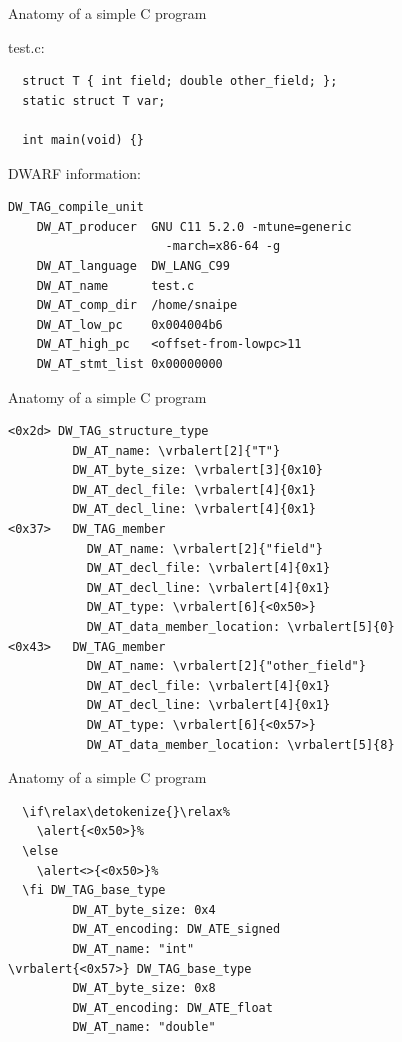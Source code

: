 \documentclass[10pt]{beamer}
\newcommand{\vrbalert}[2][]{%
  \if\relax\detokenize{#1}\relax%
    \alert{#2}%
  \else
    \alert<#1>{#2}%
  \fi}
\begin{document}
\begin{frame}[fragile]{Anatomy of a simple C program}

  test.c:
  \begin{lstlisting}
  struct T { int field; double other_field; };
  static struct T var;

  int main(void) {}
  \end{lstlisting}

  \pause{}

  DWARF information:
  \begin{Verbatim}[commandchars=\\\{\},fontsize=\small,frame=single]
  DW_TAG_compile_unit
    DW_AT_producer  GNU C11 5.2.0 -mtune=generic 
                      -march=x86-64 -g
    DW_AT_language  DW_LANG_C99
    DW_AT_name      test.c
    DW_AT_comp_dir  /home/snaipe
    DW_AT_low_pc    0x004004b6
    DW_AT_high_pc   <offset-from-lowpc>11
    DW_AT_stmt_list 0x00000000
  \end{Verbatim}
\end{frame}

\begin{frame}[fragile]{Anatomy of a simple C program}
\begin{Verbatim}[commandchars=\\\{\},fontsize=\small,frame=single]
<0x2d> DW_TAG_structure_type
         DW_AT_name: \vrbalert[2]{"T"}
         DW_AT_byte_size: \vrbalert[3]{0x10}
         DW_AT_decl_file: \vrbalert[4]{0x1}
         DW_AT_decl_line: \vrbalert[4]{0x1}
<0x37>   DW_TAG_member
           DW_AT_name: \vrbalert[2]{"field"}
           DW_AT_decl_file: \vrbalert[4]{0x1}
           DW_AT_decl_line: \vrbalert[4]{0x1}
           DW_AT_type: \vrbalert[6]{<0x50>}
           DW_AT_data_member_location: \vrbalert[5]{0}
<0x43>   DW_TAG_member
           DW_AT_name: \vrbalert[2]{"other_field"}
           DW_AT_decl_file: \vrbalert[4]{0x1}
           DW_AT_decl_line: \vrbalert[4]{0x1}
           DW_AT_type: \vrbalert[6]{<0x57>}
           DW_AT_data_member_location: \vrbalert[5]{8}
\end{Verbatim}
\end{frame}

\begin{frame}[fragile]{Anatomy of a simple C program}
\begin{Verbatim}[commandchars=\\\{\},fontsize=\small,frame=single]
\vrbalert{<0x50>} DW_TAG_base_type
         DW_AT_byte_size: 0x4
         DW_AT_encoding: DW_ATE_signed
         DW_AT_name: "int"
\vrbalert{<0x57>} DW_TAG_base_type
         DW_AT_byte_size: 0x8
         DW_AT_encoding: DW_ATE_float
         DW_AT_name: "double"
\end{Verbatim}
\end{frame}
\end{document}
